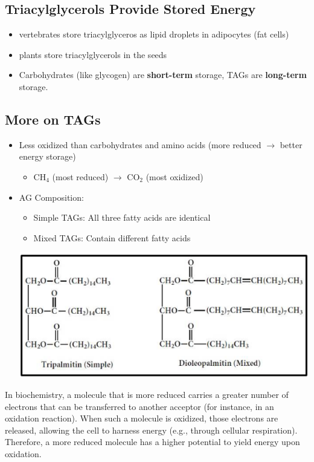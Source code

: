 \documentclass[10pt]{article}
\begin{document}
\subsection*{Triacylglycerols Provide Stored Energy}
\begin{itemize}
    \item vertebrates store triacylglyceros as lipid droplets in adipocytes (fat cells)
    \item plants store triacylglycerols in the seeds
    \item Carbohydrates (like glycogen) are \textbf{short-term} storage, TAGs are \textbf{long-term} storage.
\end{itemize}

\subsection*{More on TAGs}
\begin{itemize}
    \item Less oxidized than carbohydrates and amino acids (more reduced $\rightarrow$ better energy storage)
    \begin{itemize}
        \item CH$_4$ (most reduced) $\rightarrow$ CO$_2$ (most oxidized)
    \end{itemize}
    \item AG Composition:
    \begin{itemize}
        \item Simple TAGs: All three fatty acids are identical
        \item Mixed TAGs: Contain different fatty acids
    \end{itemize}
    \begin{center}
        \includegraphics*[scale=0.8]{L2_14.png}
    \end{center}
\end{itemize}
In biochemistry, a molecule that is more reduced carries a greater number of electrons that can be transferred to another acceptor (for instance, in an oxidation reaction).  When such a molecule is oxidized, those electrons are released, allowing the cell to harness energy (e.g., through cellular respiration).  Therefore, a more reduced molecule has a higher potential to yield energy upon oxidation.
\end{document}
